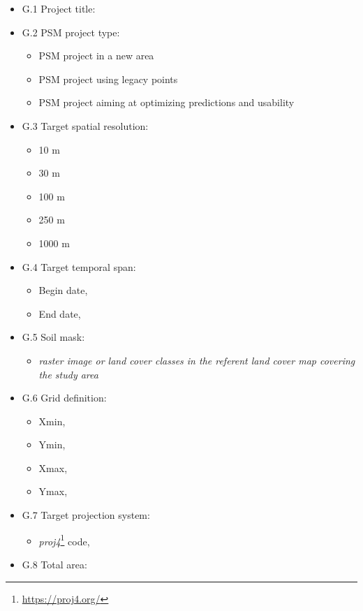 \documentclass[graybox,natbib,nospthms,UStrade]{svmono}
\providecommand{\tightlist}{%
  \setlength{\itemsep}{0pt}\setlength{\parskip}{0pt}}
\providecommand{\tightlist}{\setlength{\itemsep}{0pt}\setlength{\parskip}{0pt}}
\renewcommand{\href}[2]{#2 (\url{#1})}
\renewcommand{\href}[2]{#2\footnote{\url{#1}}}
\begin{document}
\begin{itemize}
\tightlist
\item
  G.1 Project title:
\item
  G.2 PSM project type:

  \begin{itemize}
  \tightlist
  \item
    PSM project in a new area
  \item
    PSM project using legacy points
  \item
    PSM project aiming at optimizing predictions and usability
  \end{itemize}
\item
  G.3 Target spatial resolution:

  \begin{itemize}
  \tightlist
  \item
    10 m
  \item
    30 m
  \item
    100 m
  \item
    250 m
  \item
    1000 m
  \end{itemize}
\item
  G.4 Target temporal span:

  \begin{itemize}
  \tightlist
  \item
    Begin date,
  \item
    End date,
  \end{itemize}
\item
  G.5 Soil mask:

  \begin{itemize}
  \tightlist
  \item
    \emph{raster image or land cover classes in the referent land cover map covering the study area}
  \end{itemize}
\item
  G.6 Grid definition:

  \begin{itemize}
  \tightlist
  \item
    Xmin,
  \item
    Ymin,
  \item
    Xmax,
  \item
    Ymax,
  \end{itemize}
\item
  G.7 Target projection system:

  \begin{itemize}
  \tightlist
  \item
    \href{https://proj4.org/}{\emph{proj4}} code,
  \end{itemize}
\item
  G.8 Total area:


\end{itemize}
\end{document}
